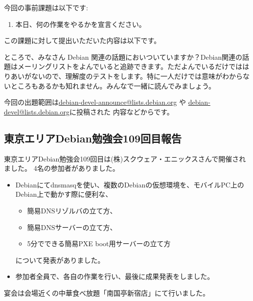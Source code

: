 \documentclass[mingoth,a4paper]{jsarticle}
\begin{document}

今回の事前課題は以下です:
\begin{enumerate}
 \item 本日、何の作業をやるかを宣言ください。
\end{enumerate}
この課題に対して提出いただいた内容は以下です。
\begin{multicols}{2}
{\small

}
\end{multicols}


ところで、みなさん Debian 関連の話題においついていますか？Debian関連の話
題はメーリングリストをよんでいると追跡できます。ただよんでいるだけではは
りあいがないので、理解度のテストをします。特に一人だけでは意味がわからな
いところもあるかも知れません。みんなで一緒に読んでみましょう。

今回の出題範囲は\url{debian-devel-announce@lists.debian.org} や \url{debian-devel@lists.debian.org}に投稿された
内容などからです。

\begin{multicols}{2}

\end{multicols}


\subsection{東京エリアDebian勉強会109回目報告}

 東京エリアDebian勉強会109回目は(株)スクウェア・エニックスさんで開催されました。
4名の参加者がありました。

\begin{itemize}
\item Debianにてdnsmasqを使い、複数のDebianの仮想環境を、モバイルPC上のDebian上で動かす際に便利な、
  \begin{itemize}
    \item 簡易DNSリゾルバの立て方、
    \item 簡易DNSサーバーの立て方、
    \item 5分でできる簡易PXE boot用サーバーの立て方
　\end{itemize}
について発表がありました。
\item 参加者全員で、各自の作業を行い、最後に成果発表をしました。
\end{itemize}

 宴会は会場近くの中華食べ放題「南国亭新宿店」にて行いました。
\end{document}
